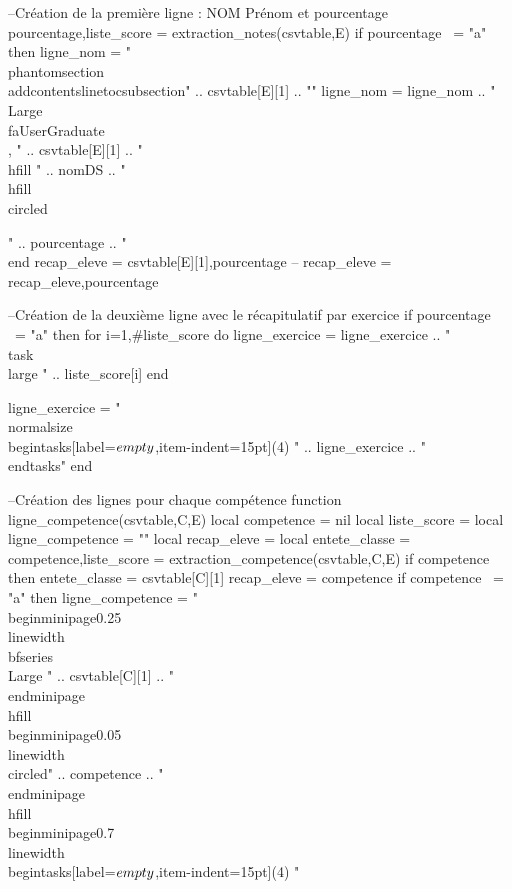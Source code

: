 \documentclass[fiche]{classe-tex3R}
\newcommand*\circled[1]{\tikz[baseline=(char.base)]{
            \node[shape=circle,draw,inner sep=2pt] (char) {#1};}}
\begin{document}
\begin{luacode*}
        --Création de la première ligne : NOM Prénom et pourcentage
        pourcentage,liste_score = extraction_notes(csvtable,E)
        if pourcentage ~= "a" then
            ligne_nom = "\\phantomsection\\addcontentsline{toc}{subsection}{" .. csvtable[E][1] .. "}"
            ligne_nom = ligne_nom .. "\\Large\\faUserGraduate\\, " .. csvtable[E][1] .. "\\hfill " .. nomDS .. " \\hfill \\circled{" .. pourcentage .. "\\%
        end
        recap_eleve = {csvtable[E][1],pourcentage}
        -- recap_eleve = recap_eleve,pourcentage
    
        --Création de la deuxième ligne avec le récapitulatif par exercice
        if pourcentage ~= "a" then
            for i=1,#liste_score do
            ligne_exercice = ligne_exercice .. "\\task \\large " .. liste_score[i]
            end
    
            ligne_exercice = "\\normalsize\\begin{tasks}[label=$\\empty$,item-indent=15pt](4) " .. ligne_exercice .. "\\end{tasks}"
        end
    
        --Création des lignes pour chaque compétence
        function ligne_competence(csvtable,C,E)
            local competence = nil
            local liste_score = {}
            local ligne_competence = ""
            local recap_eleve = {}
            local entete_classe = {}
            competence,liste_score = extraction_competence(csvtable,C,E)
            if competence then
                entete_classe = csvtable[C][1]
                recap_eleve = competence
                if competence ~= "a" then
                    ligne_competence = "\\begin{minipage}{0.25\\linewidth}\\bfseries\\Large " .. csvtable[C][1] .. "\\end{minipage}\\hfill\\begin{minipage}{0.05\\linewidth}\\circled{" .. competence .. "}\\end{minipage}\\hfill\\begin{minipage}{0.7\\linewidth}\\begin{tasks}[label=$\\empty$,item-indent=15pt](4) "
    
}
\end{luacode*}
\end{document}
